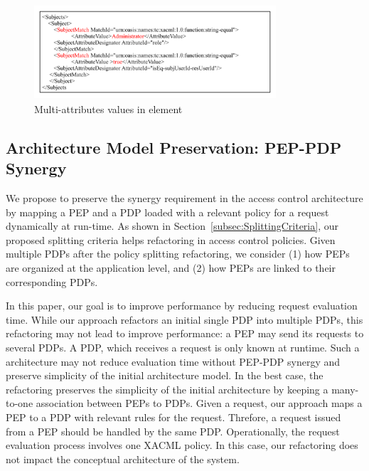 \begin{figure}[!h]
\begin{center}
\includegraphics[width=9cm, height=3.5cm]{xacml-match}
\caption{Multi-attributes values in  element}
\label{xacml-match}
\end{center}
\end{figure}
 

\subsection{Architecture Model Preservation: PEP-PDP Synergy}

We propose to preserve the synergy requirement in the access control architecture by mapping a PEP and a PDP loaded
with a relevant policy for a request dynamically at run-time.
As shown in Section~\ref{subsec:SplittingCriteria}, our proposed splitting criteria helps refactoring in access control policies. Given
multiple PDPs after the policy splitting refactoring, we consider (1) how PEPs are organized 
at the application level, and (2) how PEPs are linked to their corresponding PDPs.

In this paper, our goal is to improve performance by reducing request evaluation time. While our approach refactors an initial single PDP into multiple PDPs, this refactoring may not lead to improve performance: a PEP may send its requests to several PDPs.
A PDP, which receives a request is only known at runtime. 
Such a architecture may not reduce evaluation time without PEP-PDP synergy and preserve 
simplicity of the initial architecture model. 
In the best case, the refactoring preserves the simplicity of the initial architecture by keeping a many-to-one association 
between PEPs to PDPs. Given a request, our approach maps a PEP to a PDP with relevant rules for the request.
Threfore, a request issued from a PEP should be handled by the same PDP. Operationally, the request evaluation process involves 
one XACML policy. In this case, our refactoring does not impact the conceptual architecture of the system.

